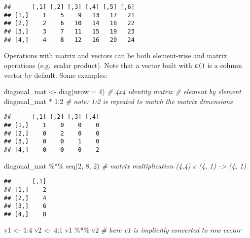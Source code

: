 \documentclass[
  oneside]{book}
\newenvironment{Shaded}{\begin{snugshade}}{\end{snugshade}}
\newcommand{\AttributeTok}[1]{\textcolor[rgb]{0.77,0.63,0.00}{#1}}
\newcommand{\CommentTok}[1]{\textcolor[rgb]{0.56,0.35,0.01}{\textit{#1}}}
\newcommand{\DecValTok}[1]{\textcolor[rgb]{0.00,0.00,0.81}{#1}}
\newcommand{\FunctionTok}[1]{\textcolor[rgb]{0.00,0.00,0.00}{#1}}
\newcommand{\NormalTok}[1]{#1}
\newcommand{\OtherTok}[1]{\textcolor[rgb]{0.56,0.35,0.01}{#1}}
\newcommand{\SpecialCharTok}[1]{\textcolor[rgb]{0.00,0.00,0.00}{#1}}
\begin{document}
\begin{verbatim}
##      [,1] [,2] [,3] [,4] [,5] [,6]
## [1,]    1    5    9   13   17   21
## [2,]    2    6   10   14   18   22
## [3,]    3    7   11   15   19   23
## [4,]    4    8   12   16   20   24
\end{verbatim}

Operations with matrix and vectors can be both element-wise
and matrix operations (e.g.~scalar product).
Note that a vector built with \texttt{c()} is a column vector by default.
Some examples:

\begin{Shaded}
\begin{Highlighting}[]
\NormalTok{diagonal\_mat }\OtherTok{\textless{}{-}} \FunctionTok{diag}\NormalTok{(}\AttributeTok{nrow =} \DecValTok{4}\NormalTok{) }\CommentTok{\# 4x4 identity matrix}
 \CommentTok{\# element by element}
\NormalTok{diagonal\_mat }\SpecialCharTok{*} \DecValTok{1}\SpecialCharTok{:}\DecValTok{2} \CommentTok{\# note: 1:2 is repeated to match the matrix dimensions}
\end{Highlighting}
\end{Shaded}

\begin{verbatim}
##      [,1] [,2] [,3] [,4]
## [1,]    1    0    0    0
## [2,]    0    2    0    0
## [3,]    0    0    1    0
## [4,]    0    0    0    2
\end{verbatim}

\begin{Shaded}
\begin{Highlighting}[]
\NormalTok{diagonal\_mat }\SpecialCharTok{\%*\%} \FunctionTok{seq}\NormalTok{(}\DecValTok{2}\NormalTok{, }\DecValTok{8}\NormalTok{, }\DecValTok{2}\NormalTok{) }\CommentTok{\# matrix multiplication (4,4) x (4, 1) {-}\textgreater{} (4, 1)}
\end{Highlighting}
\end{Shaded}

\begin{verbatim}
##      [,1]
## [1,]    2
## [2,]    4
## [3,]    6
## [4,]    8
\end{verbatim}

\begin{Shaded}
\begin{Highlighting}[]
\NormalTok{v1 }\OtherTok{\textless{}{-}} \DecValTok{1}\SpecialCharTok{:}\DecValTok{4}
\NormalTok{v2 }\OtherTok{\textless{}{-}} \DecValTok{4}\SpecialCharTok{:}\DecValTok{1}
\NormalTok{v1 }\SpecialCharTok{\%*\%}\NormalTok{ v2 }\CommentTok{\# here v1 is implicitly converted to row vector}
\end{Highlighting}
\end{Shaded}
\end{document}
